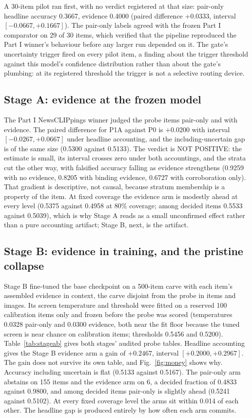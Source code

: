 \documentclass[conference]{IEEEtran}
\begin{document}
A 30-item pilot ran first, with no verdict registered at that size: pair-only headline accuracy 0.3667, evidence 0.4000 (paired difference $+0.0333$, interval $[-0.0667, +0.1667]$). The pair-only labels agreed with the frozen Part I comparator on 29 of 30 items, which verified that the pipeline reproduced the Part I winner's behaviour before any larger run depended on it. The gate's uncertainty trigger fired on every pilot item, a finding about the trigger threshold against this model's confidence distribution rather than about the gate's plumbing: at its registered threshold the trigger is not a selective routing device.

\subsection{Stage A: evidence at the frozen model}

The Part I NewsCLIPpings winner judged the probe items pair-only and with evidence. The paired difference for P1A against P0 is $+0.0200$ with interval $[-0.0267, +0.0667]$ under headline accounting, and the including-uncertain gap is of the same size (0.5300 against 0.5133). The verdict is NOT POSITIVE: the estimate is small, its interval crosses zero under both accountings, and the strata cut the other way, with falsified accuracy falling as evidence strengthens (0.9259 with no evidence, 0.8205 with binding evidence, 0.6727 with corroboration only). That gradient is descriptive, not causal, because stratum membership is a property of the item. At fixed coverage the evidence arm is modestly ahead at every level (0.5375 against 0.4958 at 80\% coverage; among decided items 0.5533 against 0.5039), which is why Stage A reads as a small unconfirmed effect rather than a pure accounting artifact; Stage B, next, is the artifact.

\subsection{Stage B: evidence in training, and the pristine collapse}

Stage B fine-tuned the base checkpoint on a 500-item carve with each item's assembled evidence in context, the carve disjoint from the probe in items and images. Its screen temperature and threshold were fitted on a reserved 100 calibration items only and frozen before the probe was scored (temperatures 0.0328 pair-only and 0.0300 evidence, both near the fit floor because the tuned screen is near chance on calibration items; thresholds 0.5456 and 0.5200). Table~\ref{tab:stageab} gives both stages' audited probe tables. Headline accounting gives the Stage B evidence arm a gain of $+0.2467$, interval $[+0.2000, +0.2967]$. The gain does not survive its own table, and Fig.~\ref{fig:money} shows why. Accuracy including uncertain is flat (0.5133 against 0.5167). The pair-only arm abstains on 155 items and the evidence arm on 6, a decided fraction of 0.4833 against 0.9800, and among decided items pair-only is slightly ahead (0.5241 against 0.5102). At every fixed coverage level the arms sit within 0.014 of each other. The headline gap is produced entirely by how often each arm commits.
\end{document}
